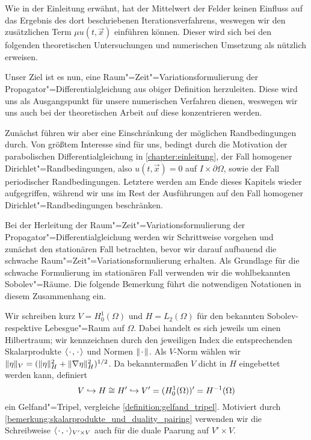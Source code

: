 Wie in der Einleitung erwähnt, hat der Mittelwert der Felder keinen Einfluss auf das Ergebnis des dort beschriebenen Iterationsverfahrens, weswegen wir den zusätzlichen Term $\mu u(t, \vec{x})$ einführen können.
Dieser wird sich bei den folgenden theoretischen Untersuchungen und numerischen Umsetzung als nützlich erweisen.

Unser Ziel ist es nun, eine Raum"=Zeit"=Variationsformulierung der Propagator"=Differentialgleichung aus obiger Definition herzuleiten.
Diese wird uns als Ausgangspunkt für unsere numerischen Verfahren dienen, weswegen wir uns auch bei der theoretischen Arbeit auf diese konzentrieren werden.

Zunächst führen wir aber eine Einschränkung der möglichen Randbedingungen durch.
Von größtem Interesse sind für uns, bedingt durch die Motivation der parabolischen Differentialgleichung in \cref{chapter:einleitung}, der Fall homogener Dirichlet"=Randbedingungen, also $u(t, \vec{x}) = 0$ auf $I \times \partial \Omega$, sowie der Fall periodischer Randbedingungen.
Letztere werden am Ende dieses Kapitels wieder aufgegriffen, während wir uns im Rest der Ausführungen auf den Fall homogener Dirichlet"=Randbedingungen beschränken.

Bei der Herleitung der Raum"=Zeit"=Variationsformulierung der Propagator"=Differentialgleichung werden wir Schrittweise vorgehen und zunächst den stationären Fall betrachten, bevor wir darauf aufbauend die schwache Raum"=Zeit"=Variationsformulierung erhalten.
Als Grundlage für die schwache Formulierung im stationären Fall verwenden wir die wohlbekannten Sobolev"=Räume.
Die folgende Bemerkung führt die notwendigen Notationen in diesem Zusammenhang ein.

\begin{Bemerkung}
\label{bemerkung:raeume_und_gelfand_tripel}
    Wir schreiben kurz $V = H^{1}_{0}(\Omega)$ und $H = L_{2}(\Omega)$ für den bekannten Sobolev- respektive Lebesgue"=Raum auf $\Omega$.
    Dabei handelt es sich jeweils um einen Hilbertraum; wir kennzeichnen durch den jeweiligen Index die entsprechenden Skalarprodukte $\langle{\mkern2mu\cdot\mkern2mu},{\mkern2mu\cdot\mkern2mu}\rangle_{}$ und Normen $\lVert{\mkern2mu\cdot\mkern2mu}\rVert$.
    Als $V$-Norm wählen wir $\lVert\eta\rVert_{V} = (\lVert\eta\rVert^{2}_{H} + \lVert\nabla \eta\rVert^{2}_{H})^{1/2}$.
    Da bekanntermaßen $V$ dicht in $H$ eingebettet werden kann, definiert
    \begin{equation}
        V \hookrightarrow H \cong H' \hookrightarrow V' = (H^{1}_{0}(\Omega))' = H^{-1}(\Omega)
    \end{equation}
    ein Gelfand"=Tripel, vergleiche \cref{definition:gelfand_tripel}.
    Motiviert durch \cref{bemerkung:skalarprodukte_und_duality_pairing} verwenden wir die Schreibweise $\langle{\mkern2mu\cdot\mkern2mu},{\mkern2mu\cdot\mkern2mu}\rangle_{V' \times V}$ auch für die duale Paarung auf $V' \times V$.
\end{Bemerkung}

